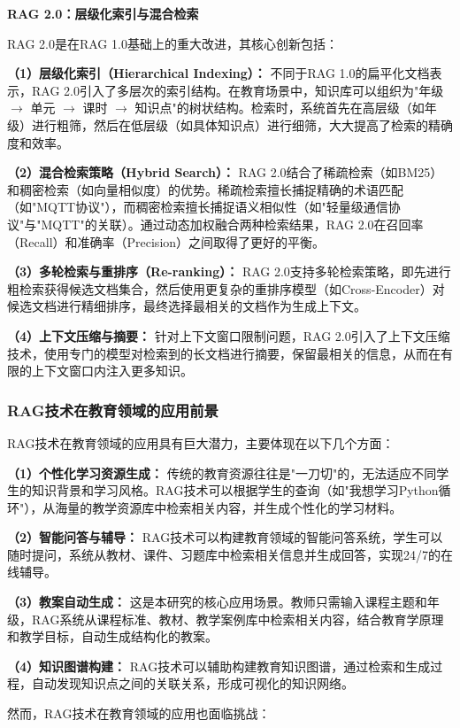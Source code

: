 \documentclass[12pt,a4paper,fontset=fandol]{ctexart}
\begin{document}
\textbf{RAG 2.0：层级化索引与混合检索}

RAG 2.0是在RAG 1.0基础上的重大改进，其核心创新包括：

\textbf{（1）层级化索引（Hierarchical Indexing）：} 不同于RAG 1.0的扁平化文档表示，RAG 2.0引入了多层次的索引结构。在教育场景中，知识库可以组织为"年级 $\rightarrow$ 单元 $\rightarrow$ 课时 $\rightarrow$ 知识点"的树状结构。检索时，系统首先在高层级（如年级）进行粗筛，然后在低层级（如具体知识点）进行细筛，大大提高了检索的精确度和效率。

\textbf{（2）混合检索策略（Hybrid Search）：} RAG 2.0结合了稀疏检索（如BM25）和稠密检索（如向量相似度）的优势。稀疏检索擅长捕捉精确的术语匹配（如"MQTT协议"），而稠密检索擅长捕捉语义相似性（如"轻量级通信协议"与"MQTT"的关联）。通过动态加权融合两种检索结果，RAG 2.0在召回率（Recall）和准确率（Precision）之间取得了更好的平衡。

\textbf{（3）多轮检索与重排序（Re-ranking）：} RAG 2.0支持多轮检索策略，即先进行粗检索获得候选文档集合，然后使用更复杂的重排序模型（如Cross-Encoder）对候选文档进行精细排序，最终选择最相关的文档作为生成上下文。

\textbf{（4）上下文压缩与摘要：} 针对上下文窗口限制问题，RAG 2.0引入了上下文压缩技术，使用专门的模型对检索到的长文档进行摘要，保留最相关的信息，从而在有限的上下文窗口内注入更多知识。

\subsubsection{RAG技术在教育领域的应用前景}
RAG技术在教育领域的应用具有巨大潜力，主要体现在以下几个方面：

\textbf{（1）个性化学习资源生成：} 传统的教育资源往往是"一刀切"的，无法适应不同学生的知识背景和学习风格。RAG技术可以根据学生的查询（如"我想学习Python循环"），从海量的教学资源库中检索相关内容，并生成个性化的学习材料。

\textbf{（2）智能问答与辅导：} RAG技术可以构建教育领域的智能问答系统，学生可以随时提问，系统从教材、课件、习题库中检索相关信息并生成回答，实现24/7的在线辅导。

\textbf{（3）教案自动生成：} 这是本研究的核心应用场景。教师只需输入课程主题和年级，RAG系统从课程标准、教材、教学案例库中检索相关内容，结合教育学原理和教学目标，自动生成结构化的教案。

\textbf{（4）知识图谱构建：} RAG技术可以辅助构建教育知识图谱，通过检索和生成过程，自动发现知识点之间的关联关系，形成可视化的知识网络。

然而，RAG技术在教育领域的应用也面临挑战：
\end{document}
